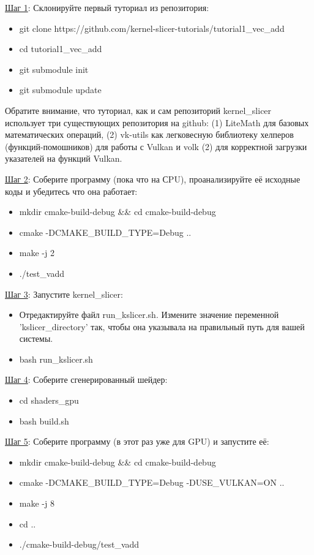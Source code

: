 \documentclass[11pt,fleqn,english,russian]{report} %
\begin{document}
\underline{Шаг 1}: Склонируйте первый туториал из репозитория:

\begin{itemize}
	\item git clone https://github.com/kernel-slicer-tutorials/tutorial1\_vec\_add
	\item cd tutorial1\_vec\_add
	\item git submodule init
	\item git submodule update
\end{itemize}

\vspace*{5px}
Обратите внимание, что туториал, как и сам репозиторий kernel\_slicer использует три существующих репозитория на github: (1) LiteMath для базовых математических операций, (2) vk-utils как легковесную библиотеку хелперов (функций-помошников) для работы с Vulkan и volk (2) для корректной загрузки указателей на функций Vulkan.

\vspace*{5px}
\noindent\underline{Шаг 2}: Соберите программу (пока что на СPU), проанализируйте её исходные коды и убедитесь что она работает: 
\begin{itemize}
	\item mkdir cmake-build-debug \&\& cd cmake-build-debug
	\item cmake -DCMAKE\_BUILD\_TYPE=Debug ..
	\item make -j 2
	\item ./test\_vadd 
\end{itemize}

\vspace*{5px}
\noindent\underline{Шаг 3}: Запустите kernel\_slicer:
\begin{itemize}
	\item Отредактируйте файл run\_kslicer.sh. Измените значение переменной 'kslicer\_directory' так, чтобы она указывала на правильный путь для вашей системы.
	\item bash run\_kslicer.sh 
\end{itemize}

\vspace*{5px}
\noindent\underline{Шаг 4}: Соберите сгенерированный шейдер:
\begin{itemize}
\item cd shaders\_gpu 	
\item bash build.sh
\end{itemize}

\vspace*{5px}
\noindent\underline{Шаг 5}: Соберите программу (в этот раз уже для GPU) и запустите её:
\begin{itemize}
	\item mkdir cmake-build-debug \&\& cd cmake-build-debug
	\item cmake -DCMAKE\_BUILD\_TYPE=Debug -DUSE\_VULKAN=ON ..
	\item make -j 8
	\item cd ..
	\item ./cmake-build-debug/test\_vadd 
\end{itemize}
\end{document}
